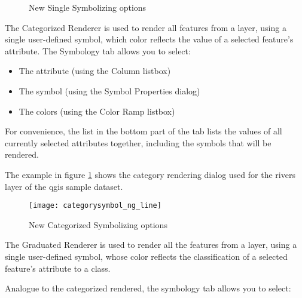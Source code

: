 \begin{figure}[ht]
\centering
\caption{New Single Symbolizing options \nixcaption}
   \hspace{1cm}
   \hspace{1cm}
\end{figure}


The Categorized Renderer is used to render all features from a layer, using a 
single user-defined symbol, which color reflects the value of a selected 
feature's attribute. The Symbology tab allows you to select:

\begin{itemize}[label=--]
\item The attribute (using the Column listbox)
\item The symbol (using the Symbol Properties dialog)
\item The colors (using the Color Ramp listbox)  
\end{itemize}

For convenience, the list in the bottom part of the tab lists the values of 
all currently selected attributes together, including the symbols that will 
be rendered.

The example in figure \ref{fig:catsymNG} shows the category rendering dialog 
used for the rivers layer of the qgis sample dataset.

\begin{figure}[ht]
   \centering
   \caption{New Categorized Symbolizing options \nixcaption}\label{fig:catsymNG}
   \texttt{[image: categorysymbol\_ng\_line]}
\end{figure}


The Graduated Renderer is used to render all the features from a layer, using 
a single user-defined symbol, whose color reflects the classification of a selected 
feature's attribute to a class.

Analogue to the categorized rendered, the symbology tab allows you to select:

